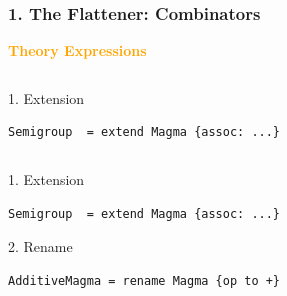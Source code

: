 \documentclass[t,10pt,numbers,fleqn,usenames,xcolor=dvipsnames]{beamer}
\begin{document}
\begin{frame}[fragile] 
\frametitle{1. The Flattener: Combinators} 
\textcolor{Orange}{\textbf{Theory Expressions}} \vspace{0.2cm}

\begin{overprint}
\begin{columns}
\begin{column}{0.45\textwidth}
\scriptsize{1. Extension}
\begin{verbatim}
Semigroup  = extend Magma {assoc: ...}
\end{verbatim}
\end{column}
\begin{column}{0.45\textwidth}


{\scriptsize
}
\end{column}
\end{columns}

\begin{columns}
\begin{column}{0.45\textwidth}
\scriptsize{1. Extension}
\begin{verbatim}
Semigroup  = extend Magma {assoc: ...}
\end{verbatim}
\vspace{0.3cm}
\scriptsize{2. Rename}
\begin{verbatim}
AdditiveMagma = rename Magma {op to +} 
\end{verbatim}
\end{column}
\begin{column}{0.45\textwidth}
{\scriptsize
}
\end{column}
\end{columns}


\end{overprint}
\end{frame}
\end{document}
